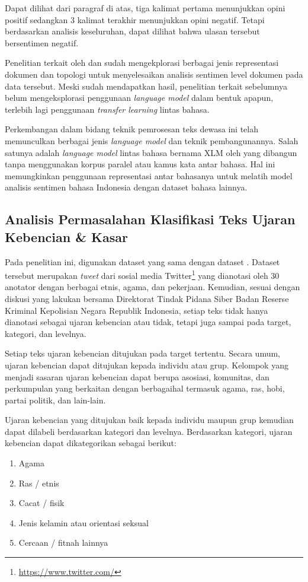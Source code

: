 	Dapat dilihat dari paragraf di atas, tiga kalimat pertama menunjukkan opini positif sedangkan 3 kalimat terakhir menunjukkan opini negatif. Tetapi berdasarkan analisis keseluruhan, dapat dilihat bahwa ulasan tersebut bersentimen negatif.

	Penelitian terkait oleh \parencite{FarhanKhodra2017} dan \parencite{CrisdayantiPurwarianti2019} sudah mengekplorasi berbagai jenis representasi dokumen dan topologi untuk menyelesaikan analisis sentimen level dokumen pada data tersebut. Meski sudah mendapatkan hasil, penelitian terkait sebelumnya belum mengeksplorasi penggunaan \textit{language model} dalam bentuk apapun, terlebih lagi penggunaan \textit{transfer learning} lintas bahasa.

	Perkembangan dalam bidang teknik pemrosesan teks dewasa ini telah memunculkan berbagai jenis \textit{language model} dan teknik pembangunannya. Salah satunya adalah \textit{language model} lintas bahasa bernama XLM oleh \parencite{LampleConneau2019} yang dibangun tanpa menggunakan korpus paralel atau kamus kata antar bahasa. Hal ini memungkinkan penggunaan representasi antar bahasanya untuk melatih model analisis sentimen bahasa Indonesia dengan dataset bahasa lainnya.

	\subsection{Analisis Permasalahan Klasifikasi Teks Ujaran Kebencian \& Kasar}

	Pada penelitian ini, digunakan dataset yang sama dengan dataset \parencite{Ibrohim_Budi_2019}. Dataset tersebut merupakan \textit{tweet} dari sosial media Twitter\footnote{\url{https://www.twitter.com/}} yang dianotasi oleh 30 anotator dengan berbagai etnis, agama, dan pekerjaan. Kemudian, sesuai dengan diskusi yang \parencite{Diksusi_Bareskrim} lakukan bersama Direktorat Tindak Pidana Siber Badan Reserse Kriminal Kepolisian Negara Republik Indonesia, setiap teks tidak hanya dianotasi sebagai ujaran kebencian atau tidak, tetapi juga sampai pada target, kategori, dan levelnya. 

	Setiap teks ujaran kebencian ditujukan pada target tertentu. Secara umum, ujaran kebencian dapat ditujukan kepada individu atau grup. Kelompok yang menjadi sasaran ujaran kebencian dapat berupa asosiasi, komunitas, dan perkumpulan yang berkaitan dengan berbagaihal termasuk agama, ras, hobi, partai politik, dan lain-lain.

	Ujaran kebencian yang ditujukan baik kepada individu maupun grup kemudian dapat dilabeli berdasarkan kategori dan levelnya. Berdasarkan kategori, ujaran kebencian dapat dikategorikan sebagai berikut:
	\begin{enumerate}
		\item Agama
		\item Ras / etnis
		\item Cacat / fisik
		\item Jenis kelamin atau orientasi seksual
		\item Cercaan / fitnah lainnya
	\end{enumerate}

